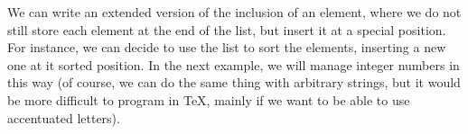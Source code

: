 \documentclass{article}
\begin{document}
\def\LinkedListDraw{{%
\psset{subgriddiv=0,gridlabels=0}
\checkLinkedList(1,2)%
\ifx\cachedata\empty
  \typeout{The list is empty!^^J}%
\else
  \Multido{\iSize=3+3}{\LinkedListMaxDepth}{%
    \checkLinkedList(\cachedata,2)%
    \ifemptydata
      \multidostop
    \fi}
  \checkLinkedList(1,2)%
  \pspicture(\iSize,1.5)
    \multido{\iPos=0+3}{\LinkedListMaxDepth}{%
      \edef\@tempa{\cachedata}%
      \checkLinkedList(\cachedata,1)%
      \rput(\iPos,0){%
        \psgrid(2,1)
        \rput(0.5,0.5){\cachedata}
        \ifnum\iPos=\z@
        \else
          \rput(-1.5,0.5){\psline[linecolor=red,arrowscale=2]{->}(1.5,0)}
        \fi}
      \checkLinkedList(\@tempa,2)%
      \ifemptydata
        \rput(\iPos,0){\psline[linecolor=red](1,0)(2,1)} %
        \multidostop%
      \fi}
  \endpspicture%
\fi}}

\makeatother


\vspace{2mm}
  We can write an extended version of the inclusion of an element, where we do
not still store each element at the end of the list, but insert it at a
special position. For instance, we can decide to use the list to sort the
elements, inserting a new one at it sorted position. In the next example, we
will manage integer numbers in this way (of course, we can do the same thing
with arbitrary strings, but it would be more difficult to program in \TeX{},
mainly if we want to be able to use accentuated letters).
\end{document}

